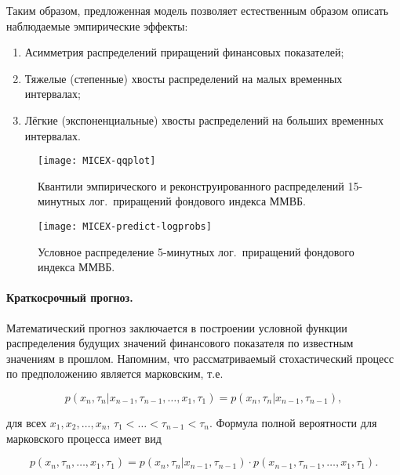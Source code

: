 \documentclass{mce-article}
\begin{document}
Таким образом, предложенная модель позволяет естественным образом
описать наблюдаемые эмпирические эффекты:

\begin{enumerate}
\item Асимметрия распределений приращений финансовых показателей;
\item Тяжелые (степенные) хвосты распределений на малых временных
  интервалах;
\item Лёгкие (экспоненциальные) хвосты распределений на больших
  временных интервалах.
\end{enumerate}

\begin{figure}
  \centering
  \begin{minipage}[t]{0.45\textwidth}
    \centering
    \texttt{[image: MICEX-qqplot]}
    \caption{Квантили эмпирического и реконструированного
      распределений 15-минутных лог.~приращений фондового индекса
      ММВБ.}
  \end{minipage}
  \hspace{0.05\textwidth}
  \begin{minipage}[t]{0.45\textwidth}
    \centering
    \texttt{[image: MICEX-predict-logprobs]}
    \caption{Условное распределение 5-минутных лог.~приращений
      фондового индекса ММВБ.}
    \label{fig:condprobs}
  \end{minipage}
\end{figure}

\paragraph{Краткосрочный прогноз.}

Математический прогноз заключается в построении условной функции
распределения будущих значений финансового показателя по известным
значениям в прошлом. Напомним, что рассматриваемый стохастический
процесс по предположению является марковским, т.е.

\begin{equation}
  p(x_n, \tau_n| x_{n - 1}, \tau_{n - 1}, \ldots, x_1, \tau_1)
  = p(x_n, \tau_n| x_{n - 1}, \tau_{n - 1}),
  \label{eq:Markov-property}
\end{equation}

для всех $x_1, x_2, \ldots, x_n$, $\tau_1 < \ldots < \tau_{n - 1} <
\tau_n$. Формула полной вероятности для марковского процесса имеет вид

\begin{equation}
  p(x_n, \tau_n, \ldots, x_1, \tau_1)
  = p(x_n, \tau_n| x_{n - 1}, \tau_{n - 1})
  \cdot p(x_{n - 1}, \tau_{n - 1}, \ldots, x_1, \tau_1).
  \label{eq:total-prob}
\end{equation}
\end{document}
